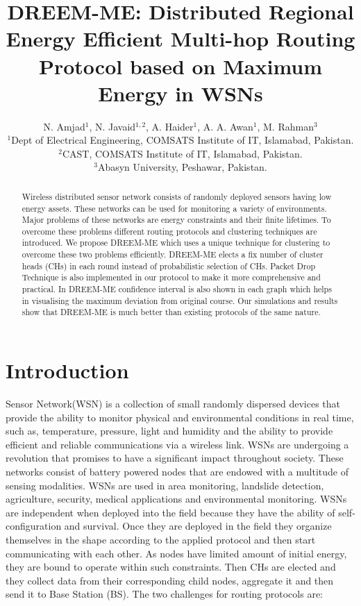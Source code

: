 \documentclass[journal]{IEEEtran}
\begin{document}
\title{DREEM-ME: Distributed Regional Energy Efficient Multi-hop Routing Protocol based on Maximum Energy in WSNs}

\author{N. Amjad$^{1}$, N. Javaid$^{1,2}$, A. Haider$^{1}$, A. A. Awan$^{1}$, M. Rahman$^{3}$\\\vspace{0.4cm}
$^{1}$Dept of Electrical Engineering, COMSATS Institute of IT, Islamabad, Pakistan.\\
$^{2}$CAST, COMSATS Institute of IT, Islamabad, Pakistan.\\
$^{3}$Abasyn University, Peshawar, Pakistan.}
\maketitle


\begin{abstract}
\boldmath
Wireless distributed sensor network consists of randomly deployed sensors having low energy assets. These networks can be used for monitoring a variety of environments. Major problems of these networks are energy constraints and their finite lifetimes. To overcome these problems different routing protocols and clustering techniques are introduced. We propose DREEM-ME which uses a unique technique for clustering to overcome these two problems efficiently. DREEM-ME elects a fix number of cluster heads (CHs) in each round instead of probabilistic selection of CHs. Packet Drop Technique is also implemented in our protocol to make it more comprehensive and practical. In DREEM-ME confidence interval is also shown in each graph which helps in visualising the maximum deviation from original course. Our simulations and results show that DREEM-ME is much better than existing protocols of the same nature.

\end{abstract}
\IEEEpeerreviewmaketitle

\section{Introduction}
 Sensor Network(WSN) is a collection of small randomly dispersed devices that provide the ability to monitor physical and environmental conditions in real time, such as, temperature, pressure, light and humidity and the ability to provide efficient and reliable communications via a wireless link. WSNs are undergoing a revolution that promises to have a significant impact throughout society. These networks consist of battery powered nodes that are endowed with a multitude of sensing modalities. WSNs are used in area monitoring, landslide detection, agriculture, security, medical applications and environmental monitoring.
 WSNs are independent when deployed into the field because they have the ability of self-configuration and survival. Once they are deployed in the field they organize themselves in the shape according to the applied protocol and then start communicating with each other. As nodes have limited amount of initial energy, they are bound to operate within such constraints. Then CHs are elected and they collect data from their corresponding child nodes, aggregate it and then send it to Base Station (BS). The two challenges for routing protocols are:
\end{document}

